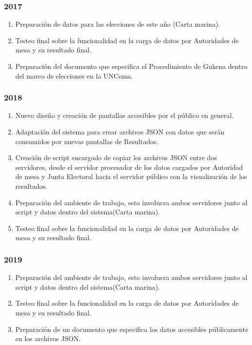 \subsubsection{2017}
\begin{enumerate}
    \item Preparación de datos para las elecciones de este año (Carta marina).
    \item Testeo final sobre la funcionalidad en la carga de datos por Autoridades de mesa y su resultado final.
    \item Preparación del documento que especifica el Procedimiento de Gukena dentro del marco de elecciones en la UNComa.
\end{enumerate}
\subsubsection{2018}
\begin{enumerate}
    \item Nuevo diseño y creación de pantallas accesibles por el público en general.
    \item Adaptación del sistema para crear archivos JSON con datos que serán consumidos por nuevas pantallas de Resultados.
    \item Creación de script encargado de copiar los archivos JSON entre dos servidores, desde el servidor procesador de los datos cargados por Autoridad de mesa y Junta Electoral hacia el servidor público con la visualización de los resultados.
    \item Preparación del ambiente de trabajo, esto involucra ambos servidores junto al script y datos dentro del sistema(Carta marina).
    \item Testeo final sobre la funcionalidad en la carga de datos por Autoridades de mesa y su resultado final.
\end{enumerate}
\subsubsection{2019}
\begin{enumerate}
    \item Preparación del ambiente de trabajo, esto involucra ambos servidores junto al script y datos dentro del sistema(Carta marina).
    \item Testeo final sobre la funcionalidad en la carga de datos por Autoridades de mesa y su resultado final.
    \item Preparación de un documento que especifica los datos accesibles públicamente en los archivos JSON.
\end{enumerate}


